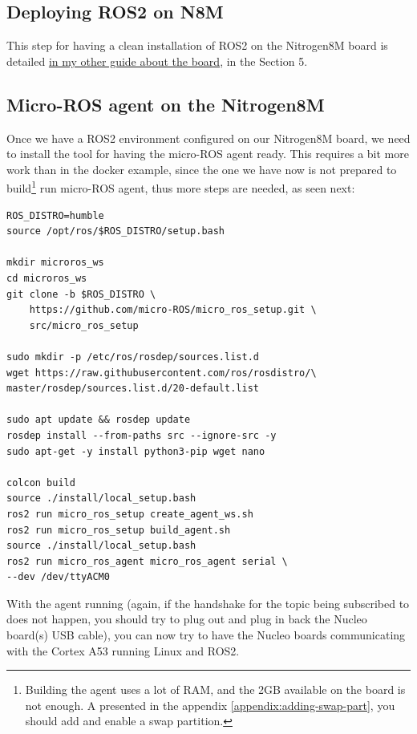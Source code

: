 \documentclass[10pt]{article}
\begin{document}
\subsection{Deploying ROS2 on N8M}
\label{sec:deploying-ros2-n8m}
This step for having a clean installation of ROS2 on the Nitrogen8M board is detailed \href{https://gitlab.com/nitrogen8m/documentation/}{in my other guide about the board}, in the Section 5.

\subsection{Micro-ROS agent on the Nitrogen8M}
\label{sec:micro-ros-agent}
Once we have a ROS2 environment configured on our Nitrogen8M board, we need to install the tool for having the micro-ROS agent ready.
This requires a bit more work than in the docker example, since the one we have now is not prepared to build\footnote{Building the agent uses a lot of RAM, and the 2GB available on the board is not enough. A presented in the appendix \ref{appendix:adding-swap-part}, you should add and enable a swap partition.} run micro-ROS agent, thus more steps are needed, as seen next:
\begin{tcolorbox}
\begin{verbatim}
ROS_DISTRO=humble
source /opt/ros/$ROS_DISTRO/setup.bash

mkdir microros_ws
cd microros_ws
git clone -b $ROS_DISTRO \
    https://github.com/micro-ROS/micro_ros_setup.git \
    src/micro_ros_setup

sudo mkdir -p /etc/ros/rosdep/sources.list.d
wget https://raw.githubusercontent.com/ros/rosdistro/\
master/rosdep/sources.list.d/20-default.list

sudo apt update && rosdep update
rosdep install --from-paths src --ignore-src -y
sudo apt-get -y install python3-pip wget nano

colcon build
source ./install/local_setup.bash
ros2 run micro_ros_setup create_agent_ws.sh
ros2 run micro_ros_setup build_agent.sh
source ./install/local_setup.bash
ros2 run micro_ros_agent micro_ros_agent serial \
--dev /dev/ttyACM0
\end{verbatim}
\end{tcolorbox}

With the agent running (again, if the handshake for the topic being subscribed to does not happen, you should try to plug out and plug in back the Nucleo board(s) USB cable), you can now try to have the Nucleo boards communicating with the Cortex A53 running Linux and ROS2.
\end{document}

